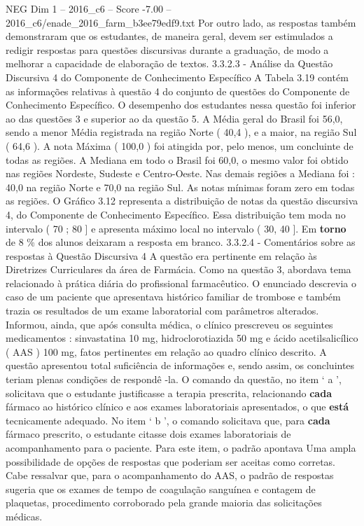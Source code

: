 \begin{textsample}{NEG Dim 1 – 2016\_c6 – Score -7.00 – 2016\_c6/enade\_2016\_farm\_b3ee79edf9.txt}
Por outro lado, as respostas também demonstraram que os estudantes, de maneira geral, devem ser estimulados a redigir respostas para questões discursivas durante a graduação, de modo a melhorar a capacidade de elaboração de textos. 3.3.2.3 - Análise da Questão Discursiva 4 do Componente de Conhecimento Específico A Tabela 3.19 contém as informações relativas à questão 4 do conjunto de questões do Componente de Conhecimento Específico.
O desempenho dos estudantes nessa questão foi inferior ao das questões 3 e superior ao da questão 5.
A Média geral do Brasil foi 56,0, sendo a menor Média registrada na região Norte ( 40,4 ), e a maior, na região Sul ( 64,6 ).
A nota Máxima ( 100,0 ) foi atingida por, pelo menos, um concluinte de todas as regiões.
A Mediana em todo o Brasil foi 60,0, o mesmo valor foi obtido nas regiões Nordeste, Sudeste e Centro-Oeste.
Nas demais regiões a Mediana foi : 40,0 na região Norte e 70,0 na região Sul.
As notas mínimas foram zero em todas as regiões.
O Gráfico 3.12 representa a distribuição de notas da questão discursiva 4, do Componente de Conhecimento Específico.
Essa distribuição tem moda no intervalo ( 70 ; 80 ] e apresenta máximo local no intervalo ( 30, 40 ].
Em \textbf{torno} de 8 \% dos alunos deixaram a resposta em branco. 3.3.2.4 - Comentários sobre as respostas à Questão Discursiva 4 A questão era pertinente em relação às Diretrizes Curriculares da área de Farmácia.
Como na questão 3, abordava tema relacionado à prática diária do profissional farmacêutico.
O enunciado descrevia o caso de um paciente que apresentava histórico familiar de trombose e também trazia os resultados de um exame laboratorial com parâmetros alterados.
Informou, ainda, que após consulta médica, o clínico prescreveu os seguintes medicamentos : sinvastatina 10 mg, hidroclorotiazida 50 mg e ácido acetilsalicílico ( AAS ) 100 mg, fatos pertinentes em relação ao quadro clínico descrito.
A questão apresentou total suficiência de informações e, sendo assim, os concluintes teriam plenas condições de respondê -la.
O comando da questão, no item ‘ a ’, solicitava que o estudante justificasse a terapia prescrita, relacionando \textbf{cada} fármaco ao histórico clínico e aos exames laboratoriais apresentados, o que \textbf{está} tecnicamente adequado.
No item ‘ b ’, o comando solicitava que, para \textbf{cada} fármaco prescrito, o estudante citasse dois exames laboratoriais de acompanhamento para o paciente.
Para este item, o padrão apontava Uma ampla possibilidade de opções de respostas que poderiam ser aceitas como corretas.
Cabe ressalvar que, para o acompanhamento do AAS, o padrão de respostas sugeria que os exames de tempo de coagulação sanguínea e contagem de plaquetas, procedimento corroborado pela grande maioria das solicitações médicas.

\end{textsample}
